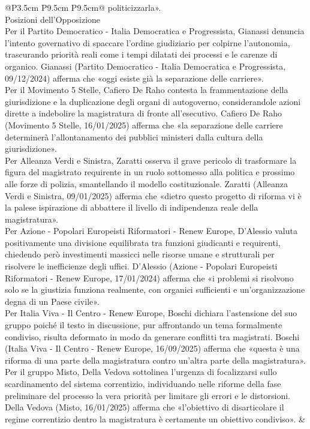 \documentclass[a4paper,11pt]{article}
\begin{document}
\begin{landscape}
\begin{longtable}{@{}P{3.5cm} P{9.5cm} P{9.5cm}@{}}
politicizzarla».\\[6pt] Posizioni dell'Opposizione\\[6pt] Per il Partito Democratico - Italia Democratica e Progressista, Gianassi denuncia l'intento governativo di spaccare l'ordine giudiziario per colpirne l'autonomia, trascurando priorità reali come i tempi dilatati dei processi e le carenze di organico. Gianassi (Partito Democratico - Italia Democratica e Progressista, 09/12/2024) afferma che «oggi esiste già la separazione delle carriere».\\[6pt] Per il Movimento 5 Stelle, Cafiero De Raho contesta la frammentazione della giurisdizione e la duplicazione degli organi di autogoverno, considerandole azioni dirette a indebolire la magistratura di fronte all'esecutivo. Cafiero De Raho (Movimento 5 Stelle, 16/01/2025) afferma che «la separazione delle carriere determinerà l'allontanamento dei pubblici ministeri dalla cultura della giurisdizione».\\[6pt] Per Alleanza Verdi e Sinistra, Zaratti osserva il grave pericolo di trasformare la figura del magistrato requirente in un ruolo sottomesso alla politica e prossimo alle forze di polizia, smantellando il modello costituzionale. Zaratti (Alleanza Verdi e Sinistra, 09/01/2025) afferma che «dietro questo progetto di riforma vi è la palese ispirazione di abbattere il livello di indipendenza reale della magistratura».\\[6pt] Per Azione - Popolari Europeisti Riformatori - Renew Europe, D'Alessio valuta positivamente una divisione equilibrata tra funzioni giudicanti e requirenti, chiedendo però investimenti massicci nelle risorse umane e strutturali per risolvere le inefficienze degli uffici. D'Alessio (Azione - Popolari Europeisti Riformatori - Renew Europe, 17/01/2024) afferma che «i problemi si risolvono solo se la giustizia funziona realmente, con organici sufficienti e un'organizzazione degna di un Paese civile».\\[6pt] Per Italia Viva - Il Centro - Renew Europe, Boschi dichiara l'astensione del suo gruppo poiché il testo in discussione, pur affrontando un tema formalmente condiviso, risulta deformato in modo da generare conflitti tra magistrati. Boschi (Italia Viva - Il Centro - Renew Europe, 16/09/2025) afferma che «questa è una riforma di una parte della magistratura contro un'altra parte della magistratura».\\[6pt] Per il gruppo Misto, Della Vedova sottolinea l'urgenza di focalizzarsi sullo scardinamento del sistema correntizio, individuando nelle riforme della fase preliminare del processo la vera priorità per limitare gli errori e le distorsioni. Della Vedova (Misto, 16/01/2025) afferma che «l'obiettivo di disarticolare il regime correntizio dentro la magistratura è certamente un obiettivo condiviso». & \\

\end{longtable}
\end{landscape}
\end{document}
